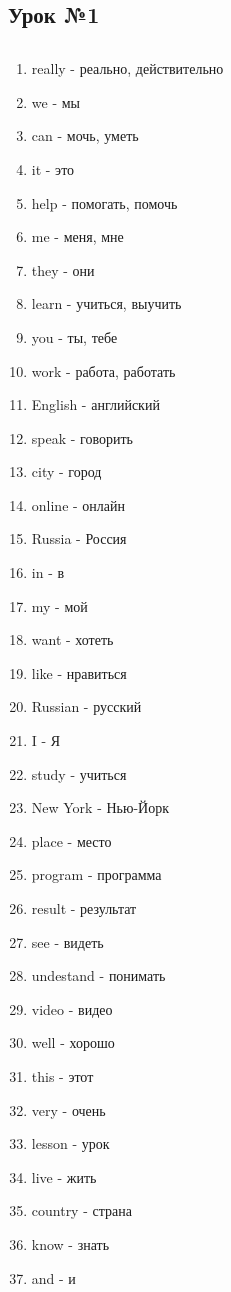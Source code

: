 \subsection{Урок №1}

\subsection*{}
\begin{multicols}{2}
    \begin{enumerate}\setlength{\itemsep}{0pt}
        \item really - реально, действительно
        \item we - мы
        \item can - мочь, уметь
        \item it - это
        \item help - помогать, помочь
        \item me - меня, мне
        \item they - они
        \item learn - учиться, выучить
        \item you - ты, тебе
        \item work - работа, работать
        \item English - английский
        \item speak - говорить
        \item city - город
        \item online - онлайн
        \item Russia - Россия
        \item in - в
        \item my - мой
        \item want - хотеть
        \item like - нравиться
        \item Russian - русский
        \item I - Я
        \item study - учиться
        \item New York - Нью-Йорк
        \item place - место
        \item program - программа
        \item result - результат
        \item see - видеть
        \item undestand - понимать
        \item video - видео
        \item well - хорошо
        \item this - этот
        \item very - очень
        \item lesson - урок
        \item live - жить
        \item country - страна
        \item know - знать
        \item and - и
    \end{enumerate}
\end{multicols}

